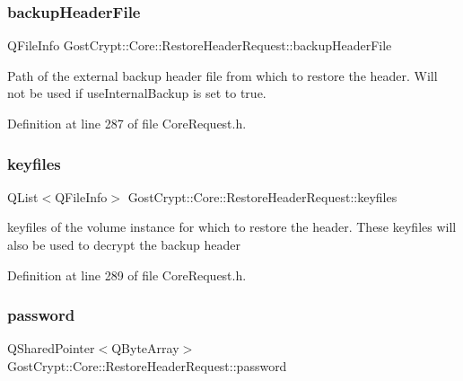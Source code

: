 \subsubsection{\texorpdfstring{backup\+Header\+File}{backupHeaderFile}}
{\footnotesize\ttfamily Q\+File\+Info Gost\+Crypt\+::\+Core\+::\+Restore\+Header\+Request\+::backup\+Header\+File}

Path of the external backup header file from which to restore the header. Will not be used if use\+Internal\+Backup is set to true. 

Definition at line 287 of file Core\+Request.\+h.

\mbox{\label{struct_gost_crypt_1_1_core_1_1_restore_header_request_ad2f1078db3b7f0c195a839a082818bd6}} 
\subsubsection{\texorpdfstring{keyfiles}{keyfiles}}
{\footnotesize\ttfamily Q\+List$<$Q\+File\+Info$>$ Gost\+Crypt\+::\+Core\+::\+Restore\+Header\+Request\+::keyfiles}

keyfiles of the volume instance for which to restore the header. These keyfiles will also be used to decrypt the backup header 

Definition at line 289 of file Core\+Request.\+h.

\mbox{\label{struct_gost_crypt_1_1_core_1_1_restore_header_request_ac65b8435be718da772543eb3b675eb3d}} 
\subsubsection{\texorpdfstring{password}{password}}
{\footnotesize\ttfamily Q\+Shared\+Pointer$<$Q\+Byte\+Array$>$ Gost\+Crypt\+::\+Core\+::\+Restore\+Header\+Request\+::password}

